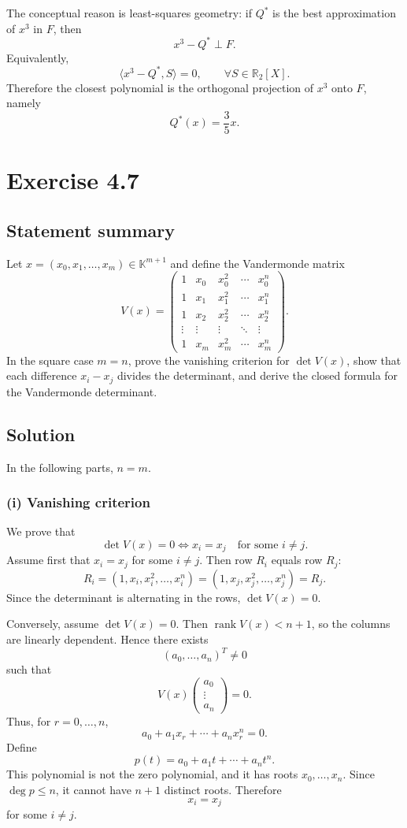 \documentclass[11pt,a4paper]{article}
\newcommand{\R}{\mathbb{R}}
\newcommand{\K}{\mathbb{K}}
\newcommand{\rank}{\operatorname{rank}}
\begin{document}
The conceptual reason is least-squares geometry: if $Q^*$ is the best approximation of $x^3$ in $F$, then
\[
x^3-Q^*\perp F.
\]
Equivalently,
\[
\langle x^3-Q^*,S\rangle=0,\qquad \forall S\in\R_2[X].
\]
Therefore the closest polynomial is the orthogonal projection of $x^3$ onto $F$, namely
\[
Q^*(x)=\frac35x.
\]

\newpage
\section*{Exercise 4.7}

\subsection*{Statement summary}
Let $x=(x_0,x_1,\dots,x_m)\in\K^{m+1}$ and define the Vandermonde matrix
\[
V(x)=
\begin{pmatrix}
1&x_0&x_0^2&\cdots&x_0^n\\
1&x_1&x_1^2&\cdots&x_1^n\\
1&x_2&x_2^2&\cdots&x_2^n\\
\vdots&\vdots&\vdots&\ddots&\vdots\\
1&x_m&x_m^2&\cdots&x_m^n
\end{pmatrix}.
\]
In the square case $m=n$, prove the vanishing criterion for $\det V(x)$, show that each difference $x_i-x_j$ divides the determinant, and derive the closed formula for the Vandermonde determinant.

\subsection*{Solution}
In the following parts, $n=m$.

\subsubsection*{(i) Vanishing criterion}
We prove that
\[
\det V(x)=0 \iff x_i=x_j\quad\text{for some }i\ne j.
\]
Assume first that $x_i=x_j$ for some $i\ne j$. Then row $R_i$ equals row $R_j$:
\[
R_i=(1,x_i,x_i^2,\dots,x_i^n)=(1,x_j,x_j^2,\dots,x_j^n)=R_j.
\]
Since the determinant is alternating in the rows, $\det V(x)=0$.

Conversely, assume $\det V(x)=0$. Then $\rank V(x)<n+1$, so the columns are linearly dependent. Hence there exists
\[
(a_0,\dots,a_n)^T\ne 0
\]
such that
\[
V(x)\begin{pmatrix}a_0\\ \vdots\\ a_n\end{pmatrix}=0.
\]
Thus, for $r=0,\dots,n$,
\[
a_0+a_1x_r+\cdots+a_nx_r^n=0.
\]
Define
\[
p(t)=a_0+a_1t+\cdots+a_nt^n.
\]
This polynomial is not the zero polynomial, and it has roots $x_0,\dots,x_n$. Since $\deg p\le n$, it cannot have $n+1$ distinct roots. Therefore
\[
x_i=x_j
\]
for some $i\ne j$.
\end{document}
